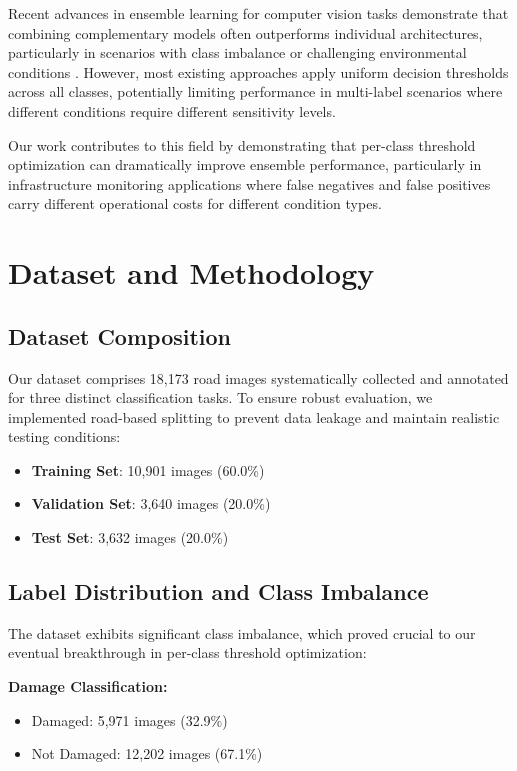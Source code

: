 \documentclass[12pt,twocolumn]{article}
\begin{document}
Recent advances in ensemble learning for computer vision tasks demonstrate that combining complementary models often outperforms individual architectures, particularly in scenarios with class imbalance or challenging environmental conditions \citet{bishop2006pattern}. However, most existing approaches apply uniform decision thresholds across all classes, potentially limiting performance in multi-label scenarios where different conditions require different sensitivity levels.

Our work contributes to this field by demonstrating that per-class threshold optimization can dramatically improve ensemble performance, particularly in infrastructure monitoring applications where false negatives and false positives carry different operational costs for different condition types.

\section{Dataset and Methodology}

\subsection{Dataset Composition}

Our dataset comprises 18,173 road images systematically collected and annotated for three distinct classification tasks. To ensure robust evaluation, we implemented road-based splitting to prevent data leakage and maintain realistic testing conditions:

\begin{itemize}[itemsep=1pt,parsep=0pt,topsep=3pt]
\item \textbf{Training Set}: 10,901 images (60.0\%)
\item \textbf{Validation Set}: 3,640 images (20.0\%)
\item \textbf{Test Set}: 3,632 images (20.0\%)
\end{itemize}

\subsection{Label Distribution and Class Imbalance}

The dataset exhibits significant class imbalance, which proved crucial to our eventual breakthrough in per-class threshold optimization:

\textbf{Damage Classification:}
\begin{itemize}[itemsep=1pt,parsep=0pt,topsep=2pt]
\item Damaged: 5,971 images (32.9\%)
\item Not Damaged: 12,202 images (67.1\%)
\end{itemize}
\end{document}
